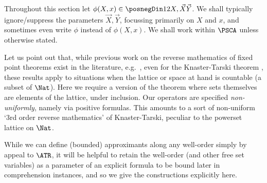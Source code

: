 
Throughout this section let $\phi(X,x) \in \posnegDin 1 2 {X,\vec X}{\vec Y}$.
We shall typically ignore/suppress the parameters $\vec X, \vec Y$, focussing primarily on $X$ and $x$, and sometimes even write $\phi$ instead of $\phi(X,x)$.
We shall work within $\PSCA$ unless otherwise stated.


\begin{remark}
    Let us point out that, while previous work on the reverse mathematics of fixed point theorems exist in the literature, e.g.\ \cite{PengYamazaki17:rev-math-fixed-point-thms-no-kt}, even for the Knaster-Tarski theorem \cite{SatoYamazaki17:rev-math-fixed-point-thms-with-kt}, these results apply to situations when the lattice or space at hand is countable (a subset of $\Nat$).
Here we require a version of the theorem where sets themselves are elements of the lattice, under inclusion.
Our operators are specified \emph{non-uniformly}, namely via positive formulas.
This amounts to a sort of non-uniform `3rd order reverse mathematics' of Knaster-Tarski, peculiar to the powerset lattice on $\Nat$.
\end{remark}




While we can define (bounded) approximants along any well-order simply by appeal to $\ATR$, it will be helpful to retain the well-order (and other free set variables) as a parameter of an explicit formula to be bound later in comprehension instances, and so we give the constructions explicitly here.


